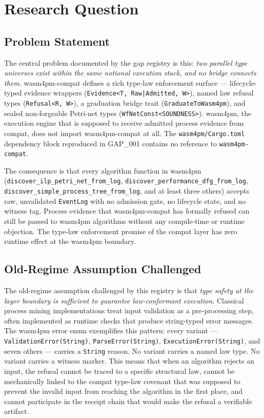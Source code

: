 
\section{Research Question}
\label{sec:gaps-research-question}

\subsection{Problem Statement}
\label{sec:gaps-rq-problem}

The central problem documented by the gap registry is this: \emph{two parallel type
universes exist within the same notional execution stack, and no bridge connects them.}
wasm4pm-compat defines a rich type-law enforcement surface — lifecycle-typed evidence
wrappers (\texttt{Evidence<T, Raw|Admitted, W>}), named law refusal types
(\texttt{Refusal<R, W>}), a graduation bridge trait (\texttt{GraduateToWasm4pm}),
and sealed non-forgeable Petri-net types (\texttt{WfNetConst<SOUNDNESS>}). wasm4pm,
the execution engine that is supposed to receive admitted process evidence from compat,
does not import wasm4pm-compat at all. The \texttt{wasm4pm/Cargo.toml} dependency block
reproduced in GAP\_001 contains no reference to \texttt{wasm4pm-compat}.

The consequence is that every algorithm function in wasm4pm (\texttt{discover\_ilp\_petri\_net\_from\_log},
\texttt{discover\_performance\_dfg\_from\_log}, \texttt{discover\_simple\_process\_tree\_from\_log},
and at least three others) accepts raw, unvalidated \texttt{EventLog} with no admission
gate, no lifecycle state, and no witness tag. Process evidence that wasm4pm-compat has
formally refused can still be passed to wasm4pm algorithms without any compile-time or
runtime objection. The type-law enforcement promise of the compat layer has zero runtime
effect at the wasm4pm boundary.

\subsection{Old-Regime Assumption Challenged}
\label{sec:gaps-rq-old-regime}

The old-regime assumption challenged by this registry is that \emph{type safety at the
layer boundary is sufficient to guarantee law-conformant execution}. Classical process
mining implementations treat input validation as a pre-processing step, often implemented
as runtime checks that produce string-typed error messages. The wasm4pm error enum
exemplifies this pattern: every variant — \texttt{ValidationError(String)},
\texttt{ParseError(String)}, \texttt{ExecutionError(String)}, and seven others —
carries a \texttt{String} reason. No variant carries a named law type. No variant carries
a witness marker. This means that when an algorithm rejects an input, the refusal cannot
be traced to a specific structural law, cannot be mechanically linked to the compat
type-law covenant that was supposed to prevent the invalid input from reaching the
algorithm in the first place, and cannot participate in the receipt chain that would
make the refusal a verifiable artifact.

